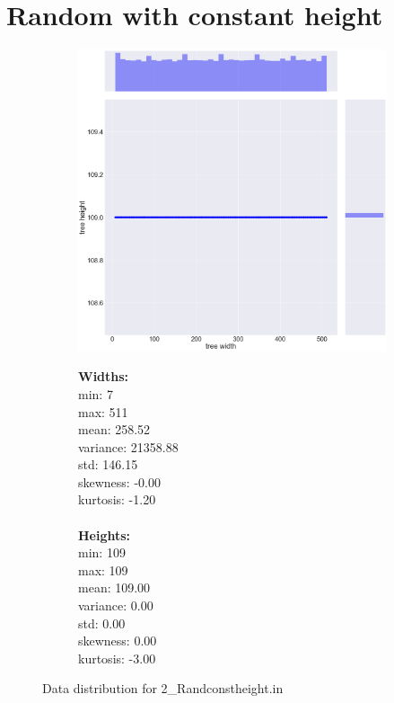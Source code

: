 \section{Random with constant height}
\begin{figure}[H]
\centering
\begin{subfigure}{.8\textwidth}
	\includegraphics[width=.9\textwidth]{img/2_RANDCONSTHEIGHT_plot.png}
\end{subfigure}%
\begin{subfigure}{.2\textwidth}
  \centering
  \begin{minipage}{1\textwidth}
\textbf{Widths:}
\\
min: 7
\\
max: 511
\\
mean: 258.52
\\
variance: 21358.88
\\
std: 146.15
\\
skewness: -0.00
\\
kurtosis: -1.20
\\\\
\textbf{Heights:}
\\
min: 109
\\
max: 109
\\
mean: 109.00
\\
variance: 0.00
\\
std: 0.00
\\
skewness: 0.00
\\
kurtosis: -3.00
  \end{minipage}
\end{subfigure}
\caption{Data distribution for 2\_Randconstheight.in}
\label{appendix:data:randconstheight}
\end{figure}

